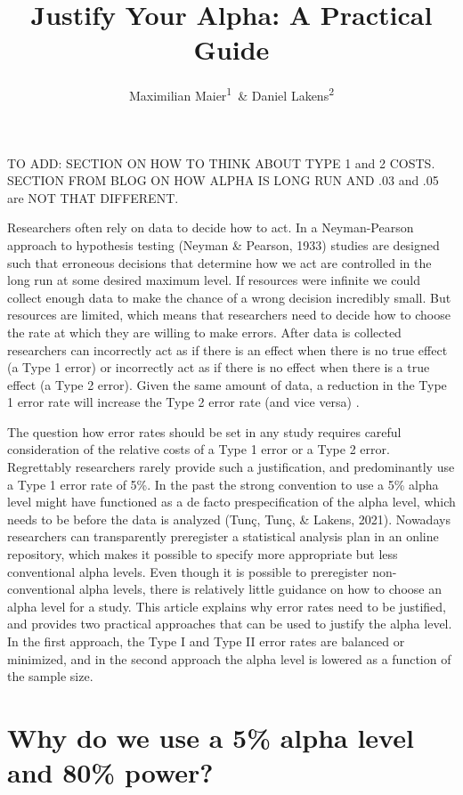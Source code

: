 \documentclass[
  english,
  ,jou, a4paper,floatsintext]{apa6}
\author{Maximilian Maier\textsuperscript{1}\ \& Daniel Lakens\textsuperscript{2}}
\affiliation{
\vspace{0.5cm}
\textsuperscript{1} University of Amsterdam, The Netherlands\\\textsuperscript{2} Eindhoven University of Technology, The Netherlands}
\title{Justify Your Alpha: A Practical Guide}
\date{}
\begin{document}
\maketitle

TO ADD: SECTION ON HOW TO THINK ABOUT TYPE 1 and 2 COSTS. SECTION FROM BLOG ON HOW ALPHA IS LONG RUN AND .03 and .05 are NOT THAT DIFFERENT.

Researchers often rely on data to decide how to act. In a Neyman-Pearson approach to hypothesis testing (Neyman \& Pearson, 1933) studies are designed such that erroneous decisions that determine how we act are controlled in the long run at some desired maximum level. If resources were infinite we could collect enough data to make the chance of a wrong decision incredibly small. But resources are limited, which means that researchers need to decide how to choose the rate at which they are willing to make errors. After data is collected researchers can incorrectly act as if there is an effect when there is no true effect (a Type 1 error) or incorrectly act as if there is no effect when there is a true effect (a Type 2 error). Given the same amount of data, a reduction in the Type 1 error rate will increase the Type 2 error rate (and vice versa) .

The question how error rates should be set in any study requires careful consideration of the relative costs of a Type 1 error or a Type 2 error. Regrettably researchers rarely provide such a justification, and predominantly use a Type 1 error rate of 5\%. In the past the strong convention to use a 5\% alpha level might have functioned as a de facto prespecification of the alpha level, which needs to be before the data is analyzed (Tunç, Tunç, \& Lakens, 2021). Nowadays researchers can transparently preregister a statistical analysis plan in an online repository, which makes it possible to specify more appropriate but less conventional alpha levels. Even though it is possible to preregister non-conventional alpha levels, there is relatively little guidance on how to choose an alpha level for a study. This article explains why error rates need to be justified, and provides two practical approaches that can be used to justify the alpha level. In the first approach, the Type I and Type II error rates are balanced or minimized, and in the second approach the alpha level is lowered as a function of the sample size.

\hypertarget{why-do-we-use-a-5-alpha-level-and-80-power}{%
\section{Why do we use a 5\% alpha level and 80\% power?}\label{why-do-we-use-a-5-alpha-level-and-80-power}}
\end{document}

